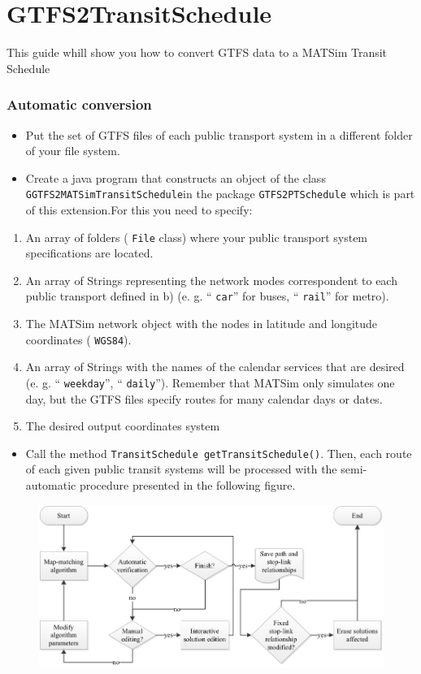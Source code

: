 \section{GTFS2TransitSchedule}

This guide whill show you how to convert GTFS data to a MATSim Transit Schedule

\subsubsection{Automatic conversion}
\begin{itemize}
	\item Put the set of GTFS files of each public transport system in a different folder of your file system.
	\item Create a java program that constructs an object of the class
\texttt{GGTFS2MATSimTransitSchedule}in the package 
\texttt{GTFS2PTSchedule} which is part of this extension.For this you need to specify:
\end{itemize}
\begin{enumerate}
	\item An array of folders (
\texttt{File} class) where your public transport system specifications are located.
	\item An array of Strings representing the network modes correspondent to each public transport defined in b) (e. g. “
\texttt{car}” for buses, “
\texttt{rail}” for metro).
	\item The MATSim network object with the nodes in latitude and longitude coordinates (
\texttt{WGS84}).
	\item An array of Strings with the names of the calendar services that are desired (e. g. “
\texttt{weekday}”, “
\texttt{daily}”). Remember that MATSim only simulates one day, but the GTFS files specify routes for many calendar days or dates.
	\item The desired output coordinates system
\end{enumerate}
\begin{itemize}
	\item Call the method 
\texttt{TransitSchedule getTransitSchedule()}.  Then, each route of each given public transit systems will be processed  with the semi-automatic procedure presented in the following figure.
\end{itemize}
\begin{figure}[htp]
	\includegraphics{figures/gtfs2schedule/gtfsAutoConversion.png}
\end{figure}




